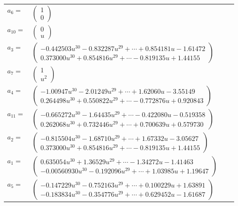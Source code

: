 \documentclass[1p]{elsarticle_modified}
\theoremstyle{definition}
\begin{document}
\begin{tabular}{m{7pt} m{180pt} m{7pt} m{180pt} }
\flushright $a_{6}=$&$\begin{pmatrix}1\\0\end{pmatrix}$ \\
\flushright $a_{10}=$&$\begin{pmatrix}0\\u\end{pmatrix}$ \\
\flushright $a_{3}=$&$\begin{pmatrix}-0.442503 u^{30}-0.832287 u^{29}+\cdots+0.854181 u-1.61472\\0.373000 u^{30}+0.854816 u^{29}+\cdots-0.819135 u+1.44155\end{pmatrix}$ \\
\flushright $a_{7}=$&$\begin{pmatrix}1\\u^2\end{pmatrix}$ \\
\flushright $a_{4}=$&$\begin{pmatrix}-1.00947 u^{30}-2.01249 u^{29}+\cdots+1.62060 u-3.55149\\0.264498 u^{30}+0.550822 u^{29}+\cdots-0.772876 u+0.920843\end{pmatrix}$ \\
\flushright $a_{11}=$&$\begin{pmatrix}-0.665272 u^{30}-1.64435 u^{29}+\cdots-0.422080 u-0.519358\\0.262068 u^{30}+0.732446 u^{29}+\cdots+0.700639 u+0.579730\end{pmatrix}$ \\
\flushright $a_{2}=$&$\begin{pmatrix}-0.815504 u^{30}-1.68710 u^{29}+\cdots+1.67332 u-3.05627\\0.373000 u^{30}+0.854816 u^{29}+\cdots-0.819135 u+1.44155\end{pmatrix}$ \\
\flushright $a_{1}=$&$\begin{pmatrix}0.635054 u^{30}+1.36529 u^{29}+\cdots-1.34272 u-1.41463\\-0.00560930 u^{30}-0.192096 u^{29}+\cdots+1.03985 u+1.19647\end{pmatrix}$ \\
\flushright $a_{5}=$&$\begin{pmatrix}-0.147229 u^{30}-0.752163 u^{29}+\cdots+0.100229 u+1.63891\\-0.183834 u^{30}-0.354776 u^{29}+\cdots+0.629452 u-1.61687\end{pmatrix}$ \\

\end{tabular}
\end{document}
